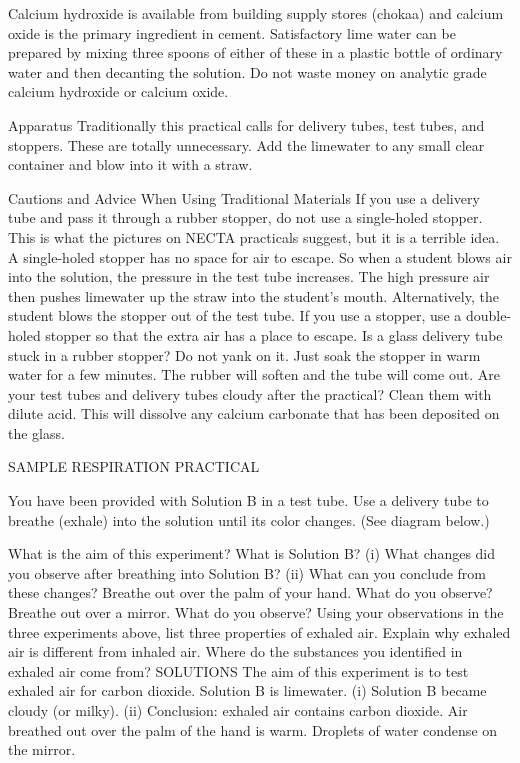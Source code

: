 \begin{enumerate}
Calcium hydroxide is available from building supply stores (chokaa) and calcium oxide is the primary ingredient in cement. Satisfactory lime water can be prepared by mixing three spoons of either of these in a plastic bottle of ordinary water and then decanting the solution. Do not waste money on analytic grade calcium hydroxide or calcium oxide.
 
Apparatus
	Traditionally this practical calls for delivery tubes, test tubes, and stoppers. These are totally unnecessary. Add the limewater to any small clear container and blow into it with a straw.

Cautions and Advice When Using Traditional Materials
	If you use a delivery tube and pass it through a rubber stopper, do not use a single-holed stopper. This is what the pictures on NECTA practicals suggest, but it is a terrible idea. A single-holed stopper has no space for air to escape. So when a student blows air into the solution, the pressure in the test tube increases. The high pressure air then pushes limewater up the straw into the student's mouth. Alternatively, the student blows the stopper out of the test tube. If you use a stopper, use a double-holed stopper so that the extra air has a place to escape.
	Is a glass delivery tube stuck in a rubber stopper? Do not yank on it. Just  soak the stopper in warm water for a few minutes. The rubber will soften and the tube will come out.
	Are your test tubes and delivery tubes cloudy after the practical? Clean them with dilute acid. This will dissolve any calcium carbonate that has been deposited on the glass.


SAMPLE RESPIRATION PRACTICAL

You have been provided with Solution B in a test tube. Use a delivery tube to breathe (exhale) into the solution until its color changes. (See diagram below.) 

What is the aim of this experiment?
What is Solution B?
(i) What changes did you observe after breathing into Solution B?	
(ii) What can you conclude from these changes?
Breathe out over the palm of your hand. What do you observe?
Breathe out over a mirror. What do you observe?
Using your observations in the three experiments above, list three properties of exhaled air.
Explain why exhaled air is different from inhaled air. Where do the substances you identified in exhaled air come from?
SOLUTIONS
The aim of this experiment is to test exhaled air for carbon dioxide.
Solution B is limewater.
(i) Solution B became cloudy (or milky).
(ii) Conclusion: exhaled air contains carbon dioxide.
Air breathed out over the palm of the hand is warm.
Droplets of water condense on the mirror.



\end{enumerate}
